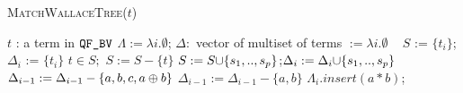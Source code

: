 \begin{algorithm}[t]
 \caption{\textsc{MatchWallaceTree}($t$)}
 \label{alg:wallace}
 \begin{algorithmic}[1]
   \Ensure $t$ : a term in $\texttt{QF\_BV}$
   \State $\Lambda := \lambda i. \emptyset$;
   $\Delta : $ vector of multiset of terms $ := \lambda i. \emptyset$
   ~\Return{$\emptyset$}
   \State $S$ := $\{t_i\}$;$\Delta_i$ := $\{t_{i}\}$
   \State $t \in S;$ $S := S - \{t\}$
   \State $S := S {\cup} \{s_1,..,s_p\}$;$\Delta_i := \Delta_i {\cup} \{s_1,..,s_p\}$
   \State $\Delta_{i-1} := \Delta_{i-1}- \{a,b,c,a\oplus b\}$
   \State $\Delta_{i-1} := \Delta_{i-1}- \{a,b\}$
   \State $\Lambda_i.insert( a * b )$;
   \Else~\Return{$\emptyset$}
   \EndIf
   \EndWhile
   ~\Return{$\emptyset$}
   \EndFor
   \State {}
   \EndIf
   \State~\Return{$\emptyset$}
 \end{algorithmic}
\end{algorithm}  



